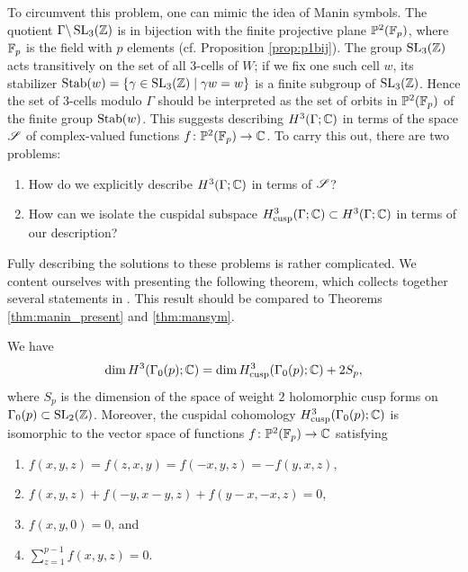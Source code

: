 To circumvent this problem, one can mimic the idea of Manin symbols.
The quotient $\Gamma \backslash \operatorname{SL}_{3} (\mathbb{Z})$ is in bijection with the
finite projective plane ${\mathbb P}^{2} (\mathbb{F}_{p})$, where $\mathbb{F}_p$ is the
field with $p$ elements (cf. Proposition \ref{prop:p1bij}).
The group $\operatorname{SL}_{3} (\mathbb{Z})$ acts transitively on the set of all $3$-cells
of $W$; if we fix one such cell $w$, its stabilizer $\operatorname{Stab} (w) =
\{\gamma \in \operatorname{SL}_{3} (\mathbb{Z}) \mid \gamma w = w \}$ is a finite subgroup
of $\operatorname{SL}_{3} (\mathbb{Z})$.  Hence the set of $3$-cells modulo $\Gamma$ should
be interpreted as the set of orbits in ${\mathbb P}^{2} (\mathbb{F}_{p})$ of the
finite group $\operatorname{Stab} (w)$.  This suggests describing $H^{3}(\Gamma ;
\mathbb{C})$ in terms of the space $\mathscr S $ of complex-valued functions $f\colon
{\mathbb P}^{2} (\mathbb{F}_{p})\rightarrow \mathbb{C}$.  To carry this out, there are two problems:
\begin{enumerate}
\item How do we explicitly describe $H^{3}(\Gamma ;
\mathbb{C})$ in terms of $\mathscr S$?
\item How can we isolate the cuspidal subspace $H^{3}_{\text{cusp}}
(\Gamma ;\mathbb{C}) \subset H^{3} (\Gamma ; \mathbb{C})$ in terms of our description?
\end{enumerate}
Fully describing the solutions to these problems is rather
complicated.  We content ourselves with presenting the following
theorem, which collects together several statements in \cite{agg}.
This result should be compared to Theorems \ref{thm:manin_present} and
\ref{thm:mansym}.

\begin{theorem}
\label{thm:agg}
  We have 
\[
\dim H^{3} (\Gamma_{0} (p); \mathbb{C}) = \dim H^{3}_{\text{cusp}} (\Gamma_{0}
(p);\mathbb{C}) + 2S_{p},
\]
where $S_{p}$ is the dimension of the space of weight $2$ holomorphic
cusp forms on $\Gamma_{0} (p)\subset \operatorname{SL}_{2} (\mathbb{Z})$.  Moreover, 
the cuspidal cohomology $H^{3}_{\text{cusp}} (\Gamma_{0}
(p); \mathbb{C})$ is isomorphic to the vector space of functions $f\colon {\mathbb P}^{2}
(\mathbb{F}_p)\rightarrow \mathbb{C}$ satisfying
\begin{enumerate}
\item $f (x,y,z) = f (z,x,y) = f (-x,y,z) = -f (y,x,z)$,
\item $f (x,y,z) + f (-y,x-y,z) + f (y-x,-x,z) = 0$,
\item $f (x,y,0)=0$, and 
\item $\sum_{z=1}^{p-1} f (x,y,z) = 0$.
\end{enumerate}
\end{theorem}


